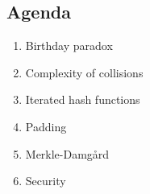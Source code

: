 

\subsection*{Agenda}
\begin{enumerate}
\item Birthday paradox
\item Complexity of collisions
\item Iterated hash functions
\item Padding
\item Merkle-Damgård
\item Security
\end{enumerate}
